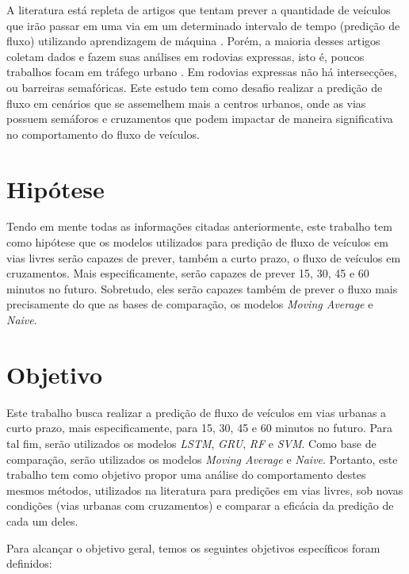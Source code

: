 A literatura está repleta de artigos que tentam prever a quantidade de veículos que irão passar em uma via em um determinado intervalo de tempo (predição de fluxo) utilizando aprendizagem de máquina \cite{doi:10.1080/01441647.2014.992496, fu2016using, hamed_prediction_1995, lv_6894591, Seoul, wang_2018, Xiaolei_2015, Zainab_2018}. Porém, a maioria desses artigos coletam dados e fazem suas análises em rodovias expressas, isto é, poucos trabalhos focam em tráfego urbano \cite{lana_2018}. Em rodovias expressas não há intersecções, ou barreiras semafóricas. Este estudo tem como desafio realizar a predição de fluxo em cenários que se assemelhem mais a centros urbanos, onde as vias possuem semáforos e cruzamentos que podem impactar de maneira significativa no comportamento do fluxo de veículos.

\section{Hipótese}

Tendo em mente todas as informações citadas anteriormente, este trabalho tem como hipótese que os modelos utilizados para predição de fluxo de veículos em vias livres serão capazes de prever, também a curto prazo, o fluxo de veículos em cruzamentos. Mais especificamente, serão capazes de prever 15, 30, 45 e 60 minutos no futuro. Sobretudo, eles serão capazes também de prever o fluxo mais precisamente do que as bases de comparação, os modelos \textit{Moving Average} e \textit{Naive}.

\section{Objetivo}

Este trabalho busca realizar a predição de fluxo de veículos em vias urbanas a curto prazo, mais especificamente, para 15, 30, 45 e 60 minutos no futuro. Para tal fim, serão utilizados os modelos \textit{\acrfull{LSTM}}, \textit{\acrfull{GRU}}, \textit{\acrfull{RF}} e \textit{\acrfull{SVM}}. Como base de comparação, serão utilizados os modelos \textit{Moving Average} e \textit{Naive}. Portanto, este trabalho tem como objetivo propor uma análise do comportamento destes mesmos métodos, utilizados na literatura para predições em vias livres, sob novas condições (vias urbanas com cruzamentos) e comparar a eficácia da predição de cada um deles.

Para alcançar o objetivo geral, temos os seguintes objetivos específicos foram definidos:

